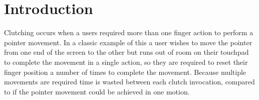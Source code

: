 \section{Introduction}
Clutching occurs when a users required more than one finger action to perform a pointer movement. In a classic example of this a user wishes to move the pointer from one end of the screen to the other but runs out of room on their touchpad to complete the movement in a single action, so they are required to reset their finger position a number of times to complete the movement. Because multiple movements are required time is wasted between each clutch invocation, compared to if the pointer movement could be achieved in one motion.